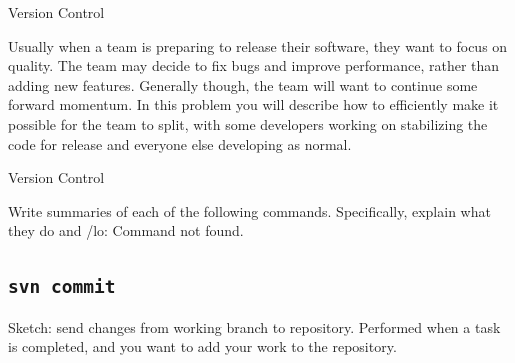 \documentclass[11pt]{exam}
\begin{document}
\begin{questions}

\vfill
\question Version Control

Usually when a team is preparing to release their software, they want to focus on quality. The team may
decide to fix bugs and improve performance, rather than adding new features. Generally though, 
the team will want to continue some forward momentum. In this problem
you will describe how to efficiently make it possible for the team to split, with some developers
working on stabilizing the code for release and everyone else developing as normal.


\vfill

\newpage
\question Version Control

Write summaries of each of the following commands. Specifically, explain what they do and
/lo: Command not found.

\begin{parts}
\part[2] {\tt svn commit} 
Sketch: send changes from working branch to repository. Performed
when a task is completed, and you want to add your work to the repository.
\vfill


\end{parts}
\end{questions}
\end{document}
